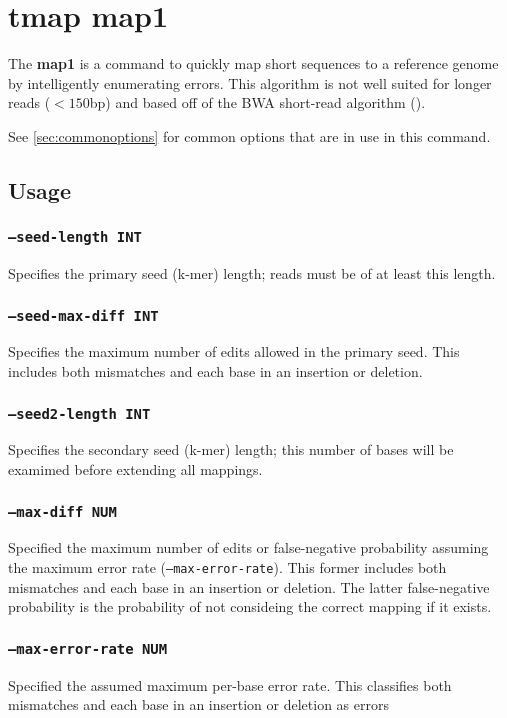 \documentclass[a4paper,12pt]{book}
\newcommand{\TT}[1]{{\tt #1}} %
\newcommand{\BF}[1]{{\bf #1}} %
\begin{document}
\section{tmap map1}
\label{sec:map1}
The \BF{map1} is a command to quickly map short sequences to a reference genome by intelligently enumerating errors.
This algorithm is not well suited for longer reads ($<150$bp) and based off of the BWA short-read algorithm (\cite{BWA-short}).

See \autoref{sec:commonoptions} for common options that are in use in this command.

\subsection{Usage}

\subsubsection{\TT{--seed-length INT}}
Specifies the primary seed (k-mer) length; reads must be of at least this length.

\subsubsection{\TT{--seed-max-diff INT}}
Specifies the maximum number of edits allowed in the primary seed.
This includes both mismatches and each base in an insertion or deletion. 

\subsubsection{\TT{--seed2-length INT}}
Specifies the secondary seed (k-mer) length; this number of bases will be examimed before extending all mappings.

\subsubsection{\TT{--max-diff NUM}}
Specified the maximum number of edits or false-negative probability assuming the maximum error rate (\TT{--max-error-rate}).
This former includes both mismatches and each base in an insertion or deletion. 
The latter false-negative probability is the probability of not consideing the correct mapping if it exists. 

\subsubsection{\TT{--max-error-rate NUM}}
Specified the assumed maximum per-base error rate.
This classifies both mismatches and each base in an insertion or deletion as errors 
\end{document}
